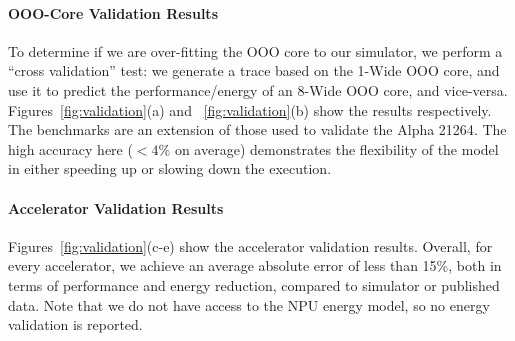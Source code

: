 \paragraph{OOO-Core Validation Results}
To determine if we are over-fitting
the OOO core to our simulator, we perform a ``cross validation'' test: 
we generate a trace based on the 1-Wide OOO core, 
and use it to predict the performance/energy of an 8-Wide OOO core, and vice-versa.
Figures~\ref{fig:validation}(a) and ~\ref{fig:validation}(b) show the results respectively.
The benchmarks are an extension of those used to validate the Alpha 21264\cite{simalpha}.
The high accuracy here ($<4\%$ on average) demonstrates the flexibility of the model
in either speeding up or slowing down the execution. 

\paragraph{Accelerator Validation Results} 
Figures~\ref{fig:validation}(c-e) show the accelerator validation results.
Overall, for every accelerator, we
achieve an average absolute error of less than 15\%, both in terms of
performance and energy reduction, compared to simulator or published data.
Note that we do not have access to the NPU energy model, so no energy
validation is reported.

